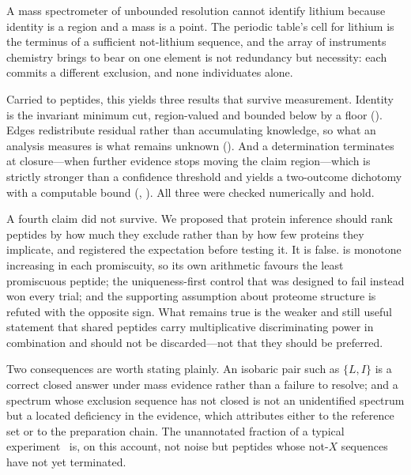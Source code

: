 \documentclass[11pt,a4paper]{article}
\theoremstyle{definition}
\theoremstyle{remark}
\begin{document}
A mass spectrometer of unbounded resolution cannot identify lithium
because identity is a region and a mass is a point. The periodic table's
cell for lithium is the terminus of a sufficient not-lithium sequence,
and the array of instruments chemistry brings to bear on one element is
not redundancy but necessity: each commits a different exclusion, and
none individuates alone.

Carried to peptides, this yields three results that survive measurement.
Identity is the invariant minimum cut, region-valued and bounded below by
a floor (). Edges redistribute residual rather than
accumulating knowledge, so what an analysis measures is what remains
unknown (). And a determination terminates at
closure---when further evidence stops moving the claim region---which is
strictly stronger than a confidence threshold and yields a two-outcome
dichotomy with a computable bound (,
). All three were checked numerically and hold.

A fourth claim did not survive. We proposed that protein inference should
rank peptides by how much they exclude rather than by how few proteins
they implicate, and registered the expectation before testing it. It is
false.  is monotone increasing in each promiscuity, so
its own arithmetic favours the least promiscuous peptide; the
uniqueness-first control that was designed to fail instead won every
trial; and the supporting assumption about proteome structure is refuted
with the opposite sign. What remains true is the weaker and still useful
statement that shared peptides carry multiplicative discriminating power
in combination and should not be discarded---not that they should be
preferred.

Two consequences are worth stating plainly. An isobaric pair such as
$\{L,I\}$ is a correct closed answer under mass evidence rather than a
failure to resolve; and a spectrum whose exclusion sequence has not
closed is not an unidentified spectrum but a located deficiency in the
evidence, which  attributes either to the reference
set or to the preparation chain. The unannotated fraction of a typical
experiment~\citep{michalski2011more} is, on this account, not noise but
peptides whose not-$X$ sequences have not yet terminated.



\end{document}
